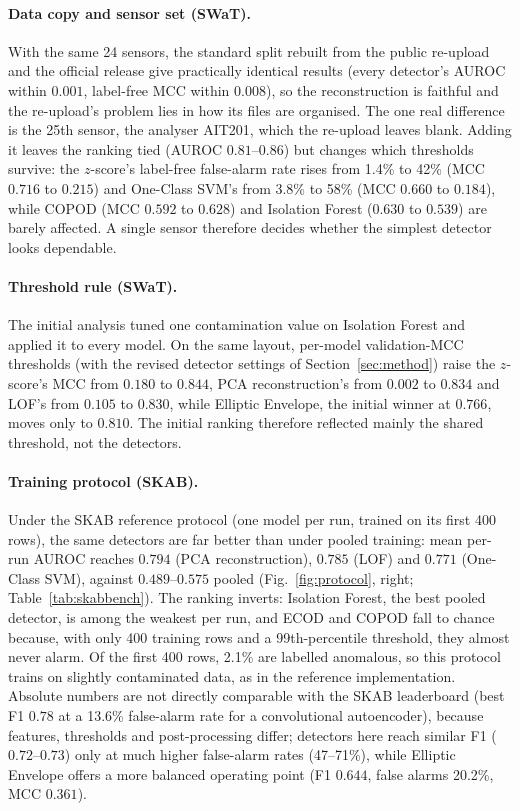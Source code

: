 \documentclass[11pt]{article}
\begin{document}
\paragraph{Data copy and sensor set (SWaT).} With the same 24 sensors, the standard
split rebuilt from the public re-upload and the official release give practically
identical results (every detector's AUROC within $0.001$, label-free MCC within $0.008$),
so the reconstruction is faithful and the re-upload's problem lies in how its files are
organised. The one real difference is the 25th sensor, the analyser AIT201, which the
re-upload leaves blank. Adding it leaves the ranking tied (AUROC $0.81$--$0.86$) but
changes which thresholds survive: the $z$-score's label-free false-alarm rate rises from
1.4\% to 42\% (MCC $0.716$ to $0.215$) and One-Class SVM's from 3.8\% to 58\% (MCC
$0.660$ to $0.184$), while COPOD (MCC $0.592$ to $0.628$) and Isolation Forest ($0.630$ to
$0.539$) are barely affected. A single sensor therefore decides whether the simplest
detector looks dependable.

\paragraph{Threshold rule (SWaT).} The initial analysis tuned one contamination
value on Isolation Forest and applied it to every model. On the same layout,
per-model validation-MCC thresholds (with the revised detector settings of
Section~\ref{sec:method}) raise the $z$-score's MCC from $0.180$ to
$0.844$, PCA reconstruction's from $0.002$ to $0.834$ and LOF's from $0.105$ to
$0.830$, while Elliptic Envelope, the initial winner at $0.766$, moves only to
$0.810$. The initial ranking therefore reflected mainly the shared threshold,
not the detectors.

\paragraph{Training protocol (SKAB).} Under the SKAB reference protocol (one
model per run, trained on its first 400 rows), the same detectors are far
better than under pooled training: mean per-run AUROC reaches $0.794$
(PCA reconstruction), $0.785$ (LOF) and $0.771$ (One-Class SVM), against
$0.489$--$0.575$ pooled (Fig.~\ref{fig:protocol}, right; Table~\ref{tab:skabbench}).
The ranking inverts: Isolation Forest, the best pooled detector, is among the
weakest per run, and ECOD and COPOD fall to chance because, with only 400 training
rows and a 99th-percentile threshold, they almost never alarm. Of the first 400
rows, 2.1\% are labelled anomalous, so this protocol trains on slightly
contaminated data, as in the reference implementation. Absolute numbers are not
directly comparable with the SKAB leaderboard (best F1 $0.78$ at a 13.6\% false-alarm
rate for a convolutional autoencoder), because features, thresholds and post-processing
differ; detectors here reach similar F1 ($0.72$--$0.73$) only at much higher
false-alarm rates (47--71\%), while Elliptic Envelope offers a more balanced
operating point (F1 $0.644$, false alarms 20.2\%, MCC $0.361$).
\end{document}
